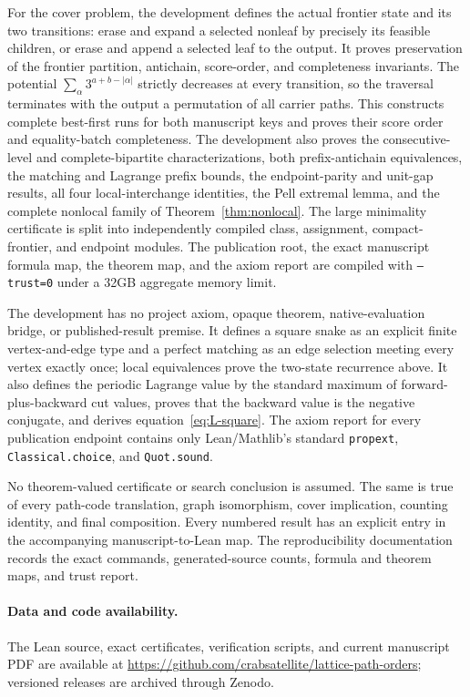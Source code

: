 \documentclass[11pt]{amsart}
\theoremstyle{definition}
\begin{document}
For the cover problem, the development defines the actual frontier state and
its two transitions: erase and expand a selected nonleaf by precisely its
feasible children, or erase and append a selected leaf to the output.  It
proves preservation of the frontier partition, antichain, score-order, and
completeness invariants.  The potential
$\sum_{\alpha}3^{a+b-|\alpha|}$ strictly decreases at every transition, so the
traversal terminates with the output a permutation of all carrier paths.  This
constructs complete best-first runs for both manuscript keys and proves their
score order and equality-batch completeness.  The development also proves the
consecutive-level and complete-bipartite
characterizations, both prefix-antichain equivalences, the matching and
Lagrange prefix bounds, the endpoint-parity and unit-gap results, all four
local-interchange identities, the Pell extremal lemma, and the complete
nonlocal family of Theorem~\ref{thm:nonlocal}.  The large minimality
certificate is split into independently compiled class, assignment,
compact-frontier, and endpoint modules.  The publication root, the exact
manuscript formula map, the theorem map, and the axiom report are compiled with
\texttt{--trust=0} under a 32GB aggregate memory limit.

The development has no project axiom, opaque theorem, native-evaluation
bridge, or published-result premise.  It defines a square snake as an explicit
finite vertex-and-edge type and a perfect matching as an edge selection meeting
every vertex exactly once; local equivalences prove the two-state recurrence
above.  It also defines the periodic Lagrange value by the standard maximum of
forward-plus-backward cut values, proves that the backward value is the
negative conjugate, and derives equation~\eqref{eq:L-square}.  The axiom report
for every publication endpoint contains only Lean/Mathlib's standard
\texttt{propext}, \texttt{Classical.choice}, and \texttt{Quot.sound}.

No theorem-valued certificate or search conclusion is assumed.  The same is
true of every path-code translation, graph isomorphism, cover implication,
counting identity, and final composition.  Every numbered result has an
explicit entry in the accompanying manuscript-to-Lean map.  The
reproducibility documentation records the exact commands, generated-source
counts, formula and theorem maps, and trust report.

\paragraph{Data and code availability.}
The Lean source, exact certificates, verification scripts, and current
manuscript PDF are available at
\url{https://github.com/crabsatellite/lattice-path-orders}; versioned releases
are archived through Zenodo.
\end{document}
